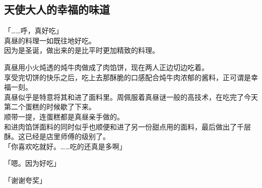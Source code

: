 \subsection{天使大人的幸福的味道}

「……呼，真好吃」\\

真昼的料理一如既往地好吃。\\

因为是圣诞，做出来的是比平时更加精致的料理。

真昼用小火炖透的炖牛肉做成了肉馅饼，现在两人正边切边吃着。\\

享受完切饼的快乐之后，吃上去那酥脆的口感配合炖牛肉浓郁的酱料，正可谓是幸福一刻。\\

真昼似乎是特意将其和进了面料里。周佩服着真昼谜一般的高技术，在吃完了今天第二个蛋糕的时候歇了下来。\\

顺带一提，连蛋糕都是真昼亲手做的。\\

和进肉馅饼面料的同时似乎也顺便和进了另一份甜点用的面料，最后做出了千层酥。这已经是店里师傅的级别了。\\

「你喜欢吃就好。……吃的还真是多啊」

「嗯。因为好吃」

「谢谢夸奖」\\

